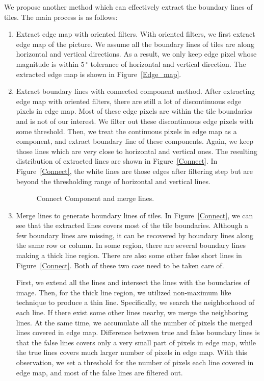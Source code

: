 We propose another method which can effectively extract the boundary lines of
tiles. The main process is as follows: \begin{enumerate} \item Extract edge map
with oriented filters. With oriented filters, we first extract edge map of the
picture. We assume all the boundary lines of tiles are along horizontal and
vertical directions. As a result, we only keep edge pixel whose magnitude is
within $5\,^{\circ}$ tolerance of horizontal and vertical direction. The
extracted edge map is shown in Figure~\ref{Edge_map}.

\item Extract boundary lines with connected component method. After extracting
edge map with oriented filters, there are still a lot of discontinuous edge
pixels in edge map. Most of these edge pixels are within the tile boundaries and
is not of our interest. We filter out these discontinuous edge pixels with some
threshold. Then, we treat the continuous pixels in edge map as a component, and
extract boundary line of these components. Again, we keep those lines which are
very close to horizontal and vertical ones. The resulting distribution of
extracted lines are shown in Figure~\ref{Connect}. In Figure~\ref{Connect}, the
white lines are those edges after filtering step but are beyond the thresholding
range of horizontal and vertical lines.

\begin{figure}[htbp]
\centering
{}
\caption{Connect Component and merge lines.}
\end{figure}

\item Merge lines to generate boundary lines of tiles. In Figure~\ref{Connect},
we can see that the extracted lines covers most of the tile boundaries. Although
a few boundary lines are missing, it can be recovered by boundary lines along
the same row or column. In some region, there are several boundary lines making
a thick line region. There are also some other false short lines in
Figure~\ref{Connect}. Both of these two case need to be taken care of.

First, we extend all the lines and intersect the lines with the boundaries of
image. Then, for the thick line region, we utilized non-maximum like technique
to produce a thin line. Specifically, we search the neighborhood of each line.
If there exist some other lines nearby, we merge the neighboring lines. At the
same time, we accumulate all the number of pixels the merged lines covered in
edge map. Difference between true and false boundary lines is that the false
lines covers only a very small part of pixels in edge map, while the true lines
covers much larger number of pixels in edge map. With this observation, we set a
threshold for the number of pixels each line covered in edge map, and most of
the false lines are filtered out.


\end{enumerate}
